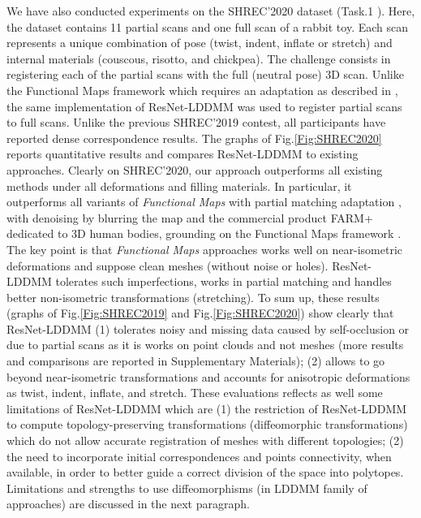 We have also conducted experiments on the SHREC'2020 dataset (Task.1 \cite{dyke2020shrec}). Here, the dataset contains 11 partial scans and one full scan of a rabbit toy. Each scan represents a unique combination of pose (twist, indent, inflate or stretch) and internal materials (couscous, risotto, and chickpea). The challenge consists in registering each of the partial scans with the full (neutral pose) 3D scan. Unlike the Functional Maps framework which requires an adaptation as described in \cite{rodola2017partial}, the same implementation of ResNet-LDDMM was used to register partial scans to full scans. Unlike the previous SHREC'2019 contest, all participants have reported dense correspondence results. The graphs of Fig.\ref{Fig:SHREC2020} reports quantitative results and compares ResNet-LDDMM to existing approaches. Clearly on SHREC'2020, our approach outperforms all existing methods under all deformations and filling materials. In particular, it outperforms all variants of \textit{Functional Maps} with partial matching adaptation \cite{rodola2017partial}, with denoising by blurring the map \cite{ezuz2017deblurring} and the commercial product FARM+ dedicated to 3D human bodies, grounding on the Functional Maps framework \cite{ovsjanikov2012functional}. The key point is that \textit{Functional Maps} approaches works well on near-isometric deformations and suppose clean meshes (without noise or holes). ResNet-LDDMM tolerates such imperfections, works in partial matching and handles better non-isometric transformations (\eg stretching). To sum up, these results (graphs of Fig.\ref{Fig:SHREC2019} and Fig.\ref{Fig:SHREC2020}) show clearly that ResNet-LDDMM (1) tolerates noisy and missing data caused by self-occlusion or due to partial scans as it is works on point clouds and not meshes (more results and comparisons are reported in Supplementary Materials); (2) allows to go beyond near-isometric transformations and accounts for anisotropic deformations as twist, indent, inflate, and stretch. These evaluations reflects as well some limitations of ResNet-LDDMM which are (1) the restriction of ResNet-LDDMM to compute topology-preserving transformations (\ie diffeomorphic transformations) which do not allow accurate registration of meshes with different topologies; (2) the need to incorporate initial correspondences and points connectivity, when available, in order to better guide a correct division of the space into polytopes. Limitations and strengths to use diffeomorphisms (in LDDMM family of approaches) are discussed in the next paragraph.


